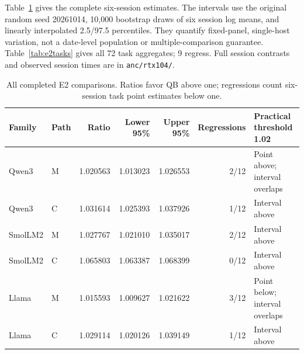 Table~\ref{tab:e2full} gives the complete six-session estimates. The intervals use the original random seed 20261014, 10,000 bootstrap draws of six session log means, and linearly interpolated 2.5/97.5 percentiles. They quantify fixed-panel, single-host variation, not a date-level population or multiple-comparison guarantee. Table~\ref{tab:e2tasks} gives all 72 task aggregates; 9 regress. Full session contrasts and observed session times are in \texttt{anc/rtx104/}.
\begin{table}[t]\centering\small
\caption{All completed E2 comparisons. Ratios favor QB above one; regressions count six-session task point estimates below one.}\label{tab:e2full}
\begin{tabular}{llrrrrl}\toprule
Family&Path&Ratio&Lower 95\%&Upper 95\%&Regressions&Practical threshold 1.02\\\midrule
Qwen3&M&1.020563&1.013023&1.026553&2/12&Point above; interval overlaps\\
Qwen3&C&1.031614&1.025393&1.037926&1/12&Interval above\\
SmolLM2&M&1.027767&1.021010&1.035017&2/12&Interval above\\
SmolLM2&C&1.065803&1.063387&1.068399&0/12&Interval above\\
Llama&M&1.015593&1.009627&1.021622&3/12&Point below; interval overlaps\\
Llama&C&1.029114&1.020126&1.039149&1/12&Interval above\\
\bottomrule\end{tabular}\end{table}
